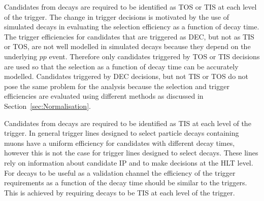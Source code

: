 Candidates from \bsmumu decays are required to be identified as TOS or TIS at each level of the trigger. The change in trigger decisions is motivated by the use of simulated decays in evaluating the selection efficiency as a function of decay time.
The trigger efficiencies for candidates that are triggered as DEC, but not as TIS or TOS, are not well modelled in simulated decays because they depend on the underlying $pp$ event. Therefore only candidates triggered by TOS or TIS decisions are used so that the selection as a function of decay time can be accurately modelled. %
Candidates triggered by DEC decisions, but not TIS or TOS do not pose the same problem for the \BF analysis because the selection and trigger efficiencies are evaluated using different methods as discussed in Section~\ref{sec:Normalisation}.

Candidates from \bhh decays are required to be identified as TIS at each level of the trigger. In general trigger lines designed to select particle decays containing muons have a uniform efficiency for candidates with different decay times, however this is not the case for trigger lines designed to select \bhh decays. These lines rely on information about candidate IP and \chiIP to make decisions at the HLT level. For \bhh decays to be useful as a validation channel the efficiency of the trigger requirements as a function of the decay time should be similar to the \bsmumu triggers. This is achieved by requiring decays to be TIS at each level of the trigger.

